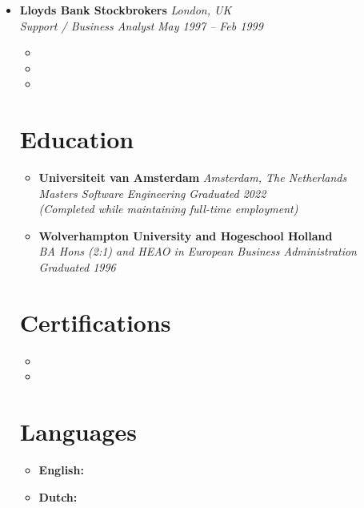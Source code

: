 \documentclass[11pt,a4paper]{article}
\begin{document}
\begin{itemize}[leftmargin=0pt,label={},itemsep=2em]
\item \textbf{Lloyds Bank Stockbrokers} \hfill \textit{London, UK}\\[2pt]
\textit{Support / Business Analyst} \hfill \textit{May 1997 -- Feb 1999}\\[1pt]
\begin{itemize}[leftmargin=*,topsep=0pt,parsep=0pt,partopsep=0pt]
    \item \LloydsProjects
    \item \LloydsDeadlines
    \item \LloydsFiscal
\end{itemize}

\section{Education}
\begin{itemize}[leftmargin=0pt,label={},itemsep=2em]
\item \textbf{Universiteit van Amsterdam} \hfill \textit{Amsterdam, The Netherlands}\\
\textit{Masters Software Engineering} \hfill \textit{Graduated 2022}\\
\textit{(Completed while maintaining full-time employment)}

\item \textbf{Wolverhampton University and Hogeschool Holland}\\
\textit{BA Hons (2:1) and HEAO in European Business Administration} \hfill \textit{Graduated 1996}
\end{itemize}

\section{Certifications}
\begin{itemize}[leftmargin=*]
\item \CertMicrosoft
\item \CertDutch
\end{itemize}

\section{Languages}
\begin{itemize}[leftmargin=*]
\item \textbf{English:} \LangEnglish
\item \textbf{Dutch:} \LangDutch
\end{itemize}

\end{itemize}
\end{document}
